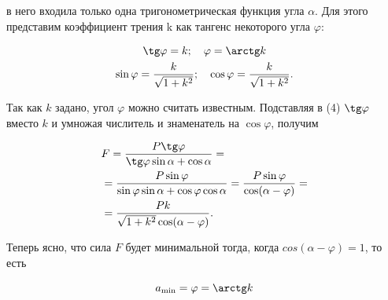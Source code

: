 

\setlength{\abovecaptionskip}{0pt plus 0pt minus 0pt}

\pagestyle{pagenumberfooterright}
\setcounter{page}{45}

% 


\newcommand{\Cm}{\mbox{\usefont{T2A}{\rmdefault}{m}{n}\cyrs\cyrm}}
\newcommand{\M}{\mbox{\usefont{T2A}{\rmdefault}{m}{n}\cyrm}}

\noindent
в него входила только одна тригонометрическая функция угла $\alpha$. Для этого представим коэффициент трения k как тангенс некоторого угла $\varphi$:

\setlength{\abovedisplayskip}{-8pt} \setlength{\abovedisplayshortskip}{-8pt}

\begin{gather*}
\tg \varphi = k; \quad \varphi = \arctg k \\
\sin \varphi = \frac{k}{\sqrt{1+k^2}}; \quad \cos \varphi = \frac{k}{\sqrt{1+k^2}}.
\end{gather*}

Так как $k$ задано, угол $\varphi$ можно считать известным. Подставляя в (4) $\tg \varphi$ вместо $k$ и умножая числитель и знаменатель на $\cos \varphi$, получим

\begin{align*}
& F = \frac{P \tg \varphi}{\tg \varphi \sin \alpha + \cos \alpha} = \\
& = \frac{P \sin \varphi}{\sin \varphi \sin \alpha + \cos \varphi \cos \alpha}
= \frac{P \sin \varphi}{\cos(\alpha - \varphi)} = \\
& = \frac{Pk}{\sqrt{1+k^2} \cos(\alpha - \varphi)}.
\end{align*}

Теперь ясно, что сила $F$ будет минимальной тогда, когда $cos(\alpha - \varphi) = 1$, то есть

\[ a_{\min} = \varphi = \arctg k \]

